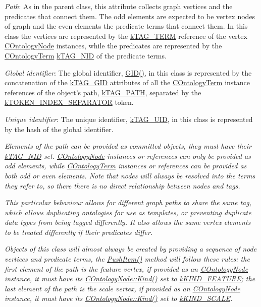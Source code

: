 {\itshape 
\begin{DoxyItemize}
\item {\itshape Path}\-: As in the parent class, this attribute collects graph vertices and the predicates that connect them. The odd elements are expected to be vertex nodes of graph and the even elements the predicate terms that connect them. In this class the vertices are represented by the \hyperlink{}{k\-T\-A\-G\-\_\-\-T\-E\-R\-M} reference of the vertex \hyperlink{class_c_ontology_node}{C\-Ontology\-Node} instances, while the predicates are represented by the \hyperlink{class_c_ontology_term}{C\-Ontology\-Term} \hyperlink{}{k\-T\-A\-G\-\_\-\-N\-I\-D} of the predicate terms. 
\item {\itshape Global identifier}\-: The global identifier, \hyperlink{}{G\-I\-D()}, in this class is represented by the concatenation of the \hyperlink{}{k\-T\-A\-G\-\_\-\-G\-I\-D} attributes of all the \hyperlink{class_c_ontology_term}{C\-Ontology\-Term} instance references of the object's path, \hyperlink{}{k\-T\-A\-G\-\_\-\-P\-A\-T\-H}, separated by the \hyperlink{}{k\-T\-O\-K\-E\-N\-\_\-\-I\-N\-D\-E\-X\-\_\-\-S\-E\-P\-A\-R\-A\-T\-O\-R} token. 
\item {\itshape Unique identifier}\-: The unique identifier, \hyperlink{}{k\-T\-A\-G\-\_\-\-U\-I\-D}, in this class is represented by the hash of the global identifier. 
\end{DoxyItemize}}

{\itshape Elements of the path can be provided as committed objects, they must have their \hyperlink{}{k\-T\-A\-G\-\_\-\-N\-I\-D} set. \hyperlink{class_c_ontology_node}{C\-Ontology\-Node} instances or references can only be provided as odd elements, while \hyperlink{class_c_ontology_term}{C\-Ontology\-Term} instances or references can be provided as both odd or even elements. Note that nodes will always be resolved into the terms they refer to, so {\itshape there there is no direct relationship between nodes and tags}.}

{\itshape This particular behaviour allows for different graph paths to share the same tag, which allows duplicating ontologies for use as templates, or preventing duplicate data types from being tagged differently. It also allows the same vertex elements to be treated differently if their predicates differ.}

{\itshape Objects of this class will almost always be created by providing a sequence of node vertices and predicate terms, the \hyperlink{}{Push\-Item()} method will follow these rules\-: the first element of the path is the feature vertex, if provided as an \hyperlink{class_c_ontology_node}{C\-Ontology\-Node} instance, it must have its \hyperlink{}{C\-Ontology\-Node\-::\-Kind()} set to \hyperlink{}{k\-K\-I\-N\-D\-\_\-\-F\-E\-A\-T\-U\-R\-E}; the last element of the path is the scale vertex, if provided as an \hyperlink{class_c_ontology_node}{C\-Ontology\-Node} instance, it must have its \hyperlink{}{C\-Ontology\-Node\-::\-Kind()} set to \hyperlink{}{k\-K\-I\-N\-D\-\_\-\-S\-C\-A\-L\-E}.}

